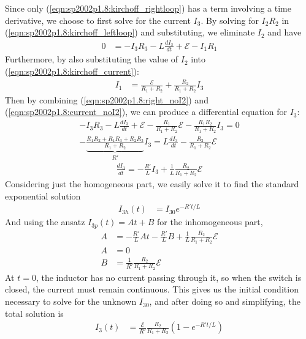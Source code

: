 Since only (\ref{eqn:sp2002p1.8:kirchoff_rightloop}) has a term involving
a time derivative, we choose to first solve for the current $I_3$. By solving
for $I_2R_2$ in (\ref{eqn:sp2002p1.8:kirchoff_leftloop}) and substituting,
we eliminate $I_2$ and have
\begin{align}
    0 &= -I_3R_3 - L\frac{dI_3}{dt} + \mathcal E - I_1R_1
    \label{eqn:sp2002p1.8:right_noI2}
\end{align}
Furthermore, by also substituting the value of $I_2$ into
(\ref{eqn:sp2002p1.8:kirchoff_current}):
\begin{align}
    I_1 &= \frac{\mathcal E}{R_1+R_2} + \frac{R_2}{R_1+R_2} I_3
    \label{eqn:sp2002p1.8:current_noI2}
\end{align}
Then by combining (\ref{eqn:sp2002p1.8:right_noI2}) and
(\ref{eqn:sp2002p1.8:current_noI2}), we can produce a differential equation
for $I_3$:
\begin{align*}
    -I_3R_3 - L\frac{dI_3}{dt} + \mathcal E - \frac{R_1}{R_1+R_2}\mathcal E -
	\frac{R_1R_2}{R_1+R_2}I_3 = 0
    \\
    -\underbrace{\frac{R_1R_2 + R_1R_3 + R_2R_3}{R_1+R_2}}_{R'}I_3 = L\frac{dI_3}{dt}
	- \frac{R_2}{R_1+R_2} \mathcal E
\end{align*}
\begin{align}
    \frac{dI_3}{dt} = -\frac{R'}{L} I_3 + \frac{1}{L}\frac{R_2}{R_1+R_2}\mathcal E
	\label{eqn:sp2002p1.8:diffeq_I3}
\end{align}
Considering just the homogeneous part, we easily solve it to find the standard
exponential solution
\begin{align*}
    I_{3h}(t) &= I_{30} e^{-R't/L}
\end{align*}
And using the ansatz $I_{3p}(t) = At + B$ for the inhomogeneous part,
\begin{align*}
    A &= -\frac{R'}{L}At - \frac{R'}{L}B + \frac 1L\frac{R_2}{R_1+R_2}\mathcal E
    \\
    A &= 0 \\
    B &= \frac{1}{R'}\frac{R_2}{R_1+R_2}\mathcal E
\end{align*}
At $t = 0$, the inductor has no current passing through it, so when the switch
is closed, the current must remain continuous. This gives us the initial
condition necessary to solve for the unknown $I_{30}$, and after doing so
and simplifying, the total solution is
\begin{align}
    I_3(t) &= \frac{\mathcal E}{R'}\frac{R_2}{R_1+R_2}(1 - e^{-R't/L})
	\label{eqn:sp2002p1.8:I3_charging}
\end{align}

